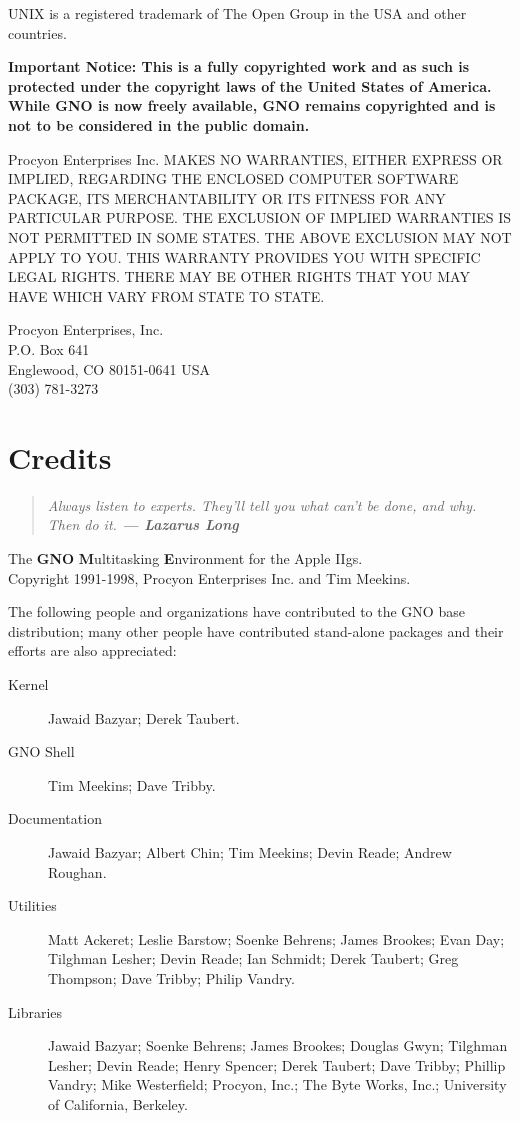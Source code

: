 \documentclass{report}
\begin{document}
UNIX is a registered trademark of The Open Group in the USA and other
countries.

\bf
Important Notice:
\rm
This is a fully 
copyrighted work and as such is protected under the copyright
laws of the United States of America.
While GNO is now freely available, GNO remains copyrighted and
is not to be considered in the public domain.

Procyon Enterprises Inc.
MAKES NO
WARRANTIES, EITHER EXPRESS OR IMPLIED, REGARDING THE ENCLOSED
COMPUTER SOFTWARE PACKAGE, ITS MERCHANTABILITY OR ITS FITNESS FOR
ANY PARTICULAR PURPOSE. THE EXCLUSION OF IMPLIED WARRANTIES IS
NOT PERMITTED IN SOME STATES. THE ABOVE EXCLUSION MAY NOT APPLY
TO YOU. THIS WARRANTY PROVIDES YOU WITH SPECIFIC LEGAL RIGHTS.
THERE MAY BE OTHER RIGHTS THAT YOU MAY HAVE WHICH VARY FROM STATE
TO STATE.

Procyon Enterprises, Inc. \\
P.O. Box 641 \\
Englewood, CO 80151-0641 USA \\
(303) 781-3273

\chapter{Credits}

\begin{quote}
\em
Always listen to experts. They'll tell you what can't be done, and why.
Then do it.  \bf --- Lazarus Long \rm
\end{quote}

The {\bf GNO} {\bf M}ultitasking {\bf E}nvironment for the Apple IIgs. \\
Copyright 1991-1998, Procyon Enterprises Inc. and Tim Meekins.

The following people and organizations have contributed to the GNO base
distribution; many other people have contributed stand-alone packages and
their efforts are also appreciated:

\begin{description}

\item[Kernel]
Jawaid Bazyar;
Derek Taubert.

\item[GNO Shell]
Tim Meekins;
Dave Tribby.

\item[Documentation]
Jawaid Bazyar;
Albert Chin;
Tim Meekins; 
Devin Reade;
Andrew Roughan.

\item[Utilities]
Matt Ackeret;
Leslie Barstow;
Soenke Behrens;
James Brookes;
Evan Day;
Tilghman Lesher;
Devin Reade;
Ian Schmidt;
Derek Taubert;
Greg Thompson;
Dave Tribby;
Philip Vandry.

\item[Libraries]
Jawaid Bazyar;
Soenke Behrens;
James Brookes;
Douglas Gwyn;
Tilghman Lesher;
Devin Reade;
Henry Spencer;
Derek Taubert;
Dave Tribby;
Phillip Vandry;
Mike Westerfield;
Procyon, Inc.;
The Byte Works, Inc.;
University of California, Berkeley.

\end{description}
\end{document}
